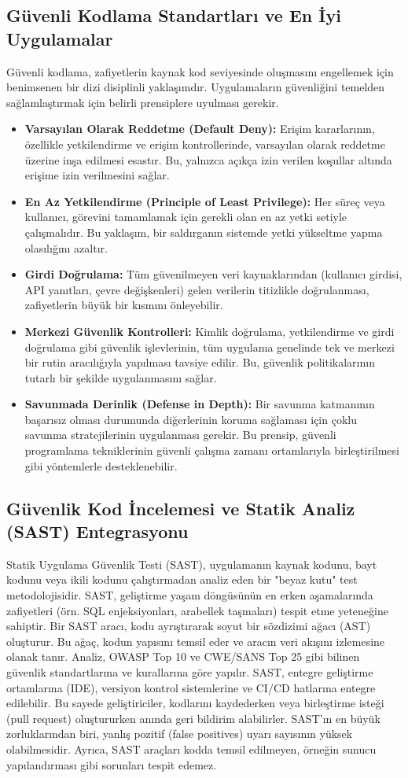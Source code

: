 \subsection{Güvenli Kodlama Standartları ve En İyi Uygulamalar}
Güvenli kodlama, zafiyetlerin kaynak kod seviyesinde oluşmasını engellemek için benimsenen bir dizi disiplinli yaklaşımdır. Uygulamaların güvenliğini temelden sağlamlaştırmak için belirli prensiplere uyulması gerekir.
\begin{itemize}
\item \textbf{Varsayılan Olarak Reddetme (Default Deny):} Erişim kararlarının, özellikle yetkilendirme ve erişim kontrollerinde, varsayılan olarak reddetme üzerine inşa edilmesi esastır. Bu, yalnızca açıkça izin verilen koşullar altında erişime izin verilmesini sağlar.
\item \textbf{En Az Yetkilendirme (Principle of Least Privilege):} Her süreç veya kullanıcı, görevini tamamlamak için gerekli olan en az yetki setiyle çalışmalıdır. Bu yaklaşım, bir saldırganın sistemde yetki yükseltme yapma olasılığını azaltır.
\item \textbf{Girdi Doğrulama:} Tüm güvenilmeyen veri kaynaklarından (kullanıcı girdisi, API yanıtları, çevre değişkenleri) gelen verilerin titizlikle doğrulanması, zafiyetlerin büyük bir kısmını önleyebilir.
\item \textbf{Merkezi Güvenlik Kontrolleri:} Kimlik doğrulama, yetkilendirme ve girdi doğrulama gibi güvenlik işlevlerinin, tüm uygulama genelinde tek ve merkezi bir rutin aracılığıyla yapılması tavsiye edilir. Bu, güvenlik politikalarının tutarlı bir şekilde uygulanmasını sağlar.
\item \textbf{Savunmada Derinlik (Defense in Depth):} Bir savunma katmanının başarısız olması durumunda diğerlerinin koruma sağlaması için çoklu savunma stratejilerinin uygulanması gerekir. Bu prensip, güvenli programlama tekniklerinin güvenli çalışma zamanı ortamlarıyla birleştirilmesi gibi yöntemlerle desteklenebilir.
\end{itemize}
\subsection{Güvenlik Kod İncelemesi ve Statik Analiz (SAST) Entegrasyonu}
Statik Uygulama Güvenlik Testi (SAST), uygulamanın kaynak kodunu, bayt kodunu veya ikili kodunu çalıştırmadan analiz eden bir "beyaz kutu" test metodolojisidir. SAST, geliştirme yaşam döngüsünün en erken aşamalarında zafiyetleri (örn. SQL enjeksiyonları, arabellek taşmaları) tespit etme yeteneğine sahiptir.
Bir SAST aracı, kodu ayrıştırarak soyut bir sözdizimi ağacı (AST) oluşturur. Bu ağaç, kodun yapısını temsil eder ve aracın veri akışını izlemesine olanak tanır. Analiz, OWASP Top 10 ve CWE/SANS Top 25 gibi bilinen güvenlik standartlarına ve kurallarına göre yapılır. SAST, entegre geliştirme ortamlarına (IDE), versiyon kontrol sistemlerine ve CI/CD hatlarına entegre edilebilir. Bu sayede geliştiriciler, kodlarını kaydederken veya birleştirme isteği (pull request) oluştururken anında geri bildirim alabilirler. SAST'ın en büyük zorluklarından biri, yanlış pozitif (false positives) uyarı sayısının yüksek olabilmesidir. Ayrıca, SAST araçları kodda temsil edilmeyen, örneğin sunucu yapılandırması gibi sorunları tespit edemez.
